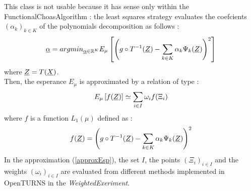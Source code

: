This class is not usable because it has sense only within the FunctionalChoasAlgorithm : the least squares strategy evaluates the coefcients $(\alpha_k)_{k \in K}$ of the polynomials decomposition as follows : 
\begin{equation}\label{defArgMin} 
{\underline{\alpha}} = argmin_{{\underline{\alpha}} \in \mathbb{R}^K} E_{\mu} \left[ \left( g \circ T^{-1}({\underline{Z}}) -  \sum_{k \in K} \alpha_k \Psi_k ({\underline{Z}})\right)^2  \right]
\end{equation}
where ${\underline{Z}} = T({\underline{X}})$.\\
Then, the esperance $ E_{\mu}$ is approximated by a relation of type : 
\begin{equation}\label{approxEsp}
E_{\mu} \left[ f({\underline{Z}}) \right] \simeq \sum_{i \in I} \omega_i f(\Xi_i)
\end{equation}
where $f$ is a function $L_1(\mu)$ defined as : 
\begin{equation}\label{fArgMin} 
f({\underline{Z}}) = \left( g \circ T^{-1}({\underline{Z}}) -  \sum_{k \in K} \alpha_k \Psi_k ({\underline{Z}})\right)^2
\end{equation}
In the approximation (\ref{approxEsp}), the set $I$, the points $(\Xi_i)_{i \in I}$ and the weights $(\omega_i)_{i \in I}$ are evaluated from different methods implemented in OpenTURNS in the \emph{WeightedExeriment}.


